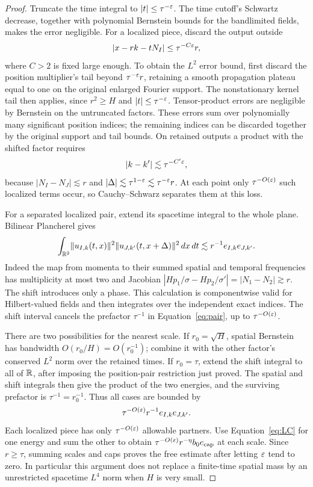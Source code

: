 \begin{proof}
Truncate the time integral to $|t|\leq\tau^{-\varepsilon}$. The time cutoff's
Schwartz decrease, together with polynomial Bernstein bounds for the
bandlimited fields, makes the error negligible. For a localized piece,
discard the output outside
\[
 |x-rk-tN_I|\leq\tau^{-C\varepsilon}r,
\]
where $C>2$ is fixed large enough. To obtain the $L^2$ error bound, first
discard the position multiplier's tail beyond $\tau^{-\varepsilon}r$, retaining
a smooth propagation plateau equal to one on the original enlarged
Fourier support. The nonstationary kernel tail then applies, since
$r^2\geq H$ and $|t|\leq\tau^{-\varepsilon}$. Tensor-product errors are
negligible by Bernstein on the untruncated factors. These errors sum over
polynomially many significant position indices; the remaining indices
can be discarded together by the original support and tail bounds.
On retained outputs a product with the shifted factor requires
\[
 |k-k'|\lesssim\tau^{-C'\varepsilon},
\]
because $|N_I-N_J|\lesssim r$ and
$|\Delta|\lesssim\tau^{1-\varepsilon}\lesssim\tau^{-\varepsilon}r$.
At each point only $\tau^{-O(\varepsilon)}$ such localized terms occur, so
Cauchy--Schwarz separates them at this loss.

For a separated localized pair, extend its spacetime integral to the
whole plane. Bilinear Plancherel gives
\[
 \int_{\mathbb R^2}\lVert u_{I,k}(t,x)\rVert^2
                    \lVert u_{J,k'}(t,x+\Delta)\rVert^2\,dx\,dt
 \lesssim r^{-1} e_{I,k}e_{J,k'}.
\]
Indeed the map from momenta to their summed spatial and temporal
frequencies has multiplicity at most two and Jacobian
$|Hp_1/\sigma-Hp_2/\sigma'|=|N_1-N_2|\gtrsim r$.
The shift introduces only a phase. This calculation is componentwise
valid for Hilbert-valued fields and then integrates over the independent
exact indices. The shift interval cancels the prefactor $\tau^{-1}$
in Equation~\eqref{eq:pair}, up to $\tau^{-O(\varepsilon)}$.

There are two possibilities for the nearest scale. If $r_0=\sqrt H$,
spatial Bernstein has bandwidth $O(r_0/H)=O(r_0^{-1})$; combine it with
the other factor's conserved $L^2$ norm over the retained times. If
$r_0=\tau$, extend the shift integral to all of $\mathbb R$, after imposing the
position-pair restriction just proved. The spatial and shift integrals
then give the product of the two energies, and the surviving prefactor
is $\tau^{-1}=r_0^{-1}$. Thus all cases are bounded by
\[
 \tau^{-O(\varepsilon)}r^{-1}e_{I,k}e_{J,k'}.
\]
Each localized piece has only $\tau^{-O(\varepsilon)}$ allowable partners.
Use Equation~\eqref{eq:LC} for one energy and sum the other to obtain
$\tau^{-O(\varepsilon)}r^{-\eta}b_0e_{\rm cap}$ at each scale. Since
$r\geq\tau$, summing scales and caps proves the free estimate after
letting $\varepsilon$ tend to zero. In particular this argument does not replace
a finite-time spatial mass by an unrestricted spacetime $L^4$ norm when
$H$ is very small.


\end{proof}
